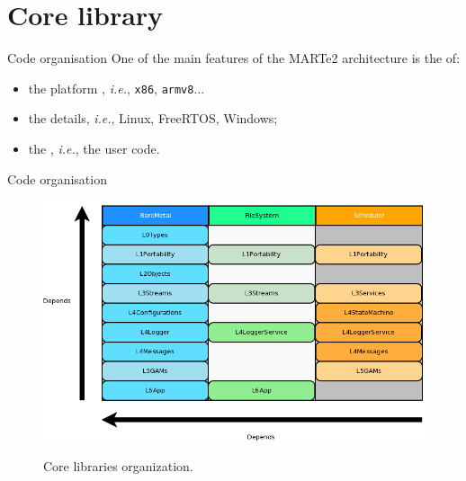 
\section{Core library}
\graphicspath{{figs/section2/}}

\begin{frame}{Code organisation}
	One of the main features of the MARTe2 architecture is the  of:
	\begin{itemize}
		\item the platform , \emph{i.e.}, \texttt{x86}, \texttt{armv8}...
		\item the  details, \emph{i.e.}, Linux, FreeRTOS, Windows;
		\item the , \emph{i.e.}, the user code.
	\end{itemize}
\end{frame}
\begin{frame}{Code organisation}
	\begin{figure}
		\centering
		\includegraphics[scale=.35]{Tiers.png}
		\label{fig:tiers}
		\caption{Core libraries organization.}
	\end{figure}
\end{frame}


